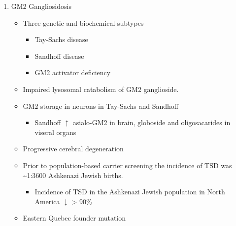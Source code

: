 \documentclass{scrartcl}
\begin{document}
\begin{enumerate}
\begin{enumerate}
\begin{itemize}
\item \(\downarrow\) cathepsin A \(\to\) 2\degree  deficiency of NEU1
\begin{itemize}
\item ML-1 (sialidosis)
\end{itemize}
\end{itemize}

of the LMC and the CSER, and that become deregulated in case of
single or combined enzyme deficiencies in sialidosis, GM1 and
GS. CMA, chaperone mediated autophagy; CSER, cell surface elastin
receptor; EBP, elastin binding protein; ECM, extracellular matrix;
LM, lysosomal membrane; LMC, lysosomal multienzyme complex; PM,
plasma membrane
\begin{center}
\texttt{[image: ./GM1\_2/figures/lmc.jpg]}
\label{org55168f1}
\end{center}

\item GM2 Gangliosidosis
\label{sec:org2174a67}
\begin{itemize}
\item Three genetic and biochemical subtypes
\begin{itemize}
\item Tay-Sachs disease
\item Sandhoff disease
\item GM2 activator deficiency
\end{itemize}
\item Impaired lysosomal catabolism of GM2 ganglioside.
\item GM2 storage in neurons in Tay-Sachs and Sandhoff
\begin{itemize}
\item Sandhoff \(\uparrow\) asialo-GM2 in brain, globoside and oligosacarides in viseral organs
\end{itemize}
\item Progressive cerebral degeneration
\item Prior to population-based carrier screening the incidence of TSD was \textasciitilde{}1:3600 Ashkenazi Jewish births.
\begin{itemize}
\item Incidence of TSD in the Ashkenazi Jewish population in North America \(\downarrow\) > 90\%
\end{itemize}
\item Eastern Quebec founder mutation
\end{itemize}



\end{enumerate}
\end{enumerate}
\end{document}
